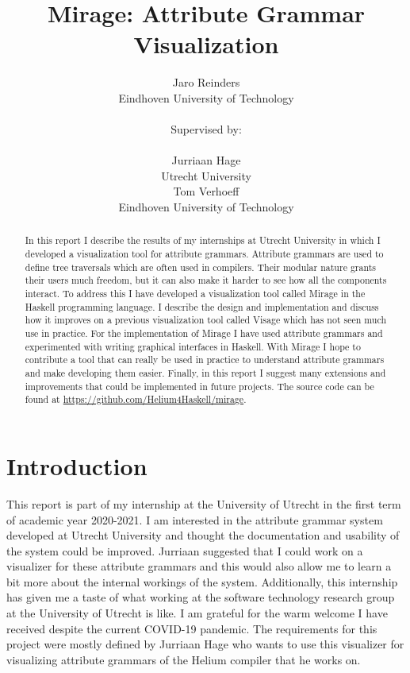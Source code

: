 \documentclass[11pt]{article}
\author{
  Jaro Reinders\\ Eindhoven University of Technology \\
  \\
  Supervised by:
  \vspace{0.5em}\\
  \begin{minipage}[t]{.4\textwidth}
    \centering
  Jurriaan Hage\\
  Utrecht University
  \end{minipage}%
  \begin{minipage}[t]{.4\textwidth}
    \centering
  Tom Verhoeff\\
  Eindhoven University of Technology
  \end{minipage}
}
\title{Mirage: Attribute Grammar Visualization}
\begin{document}
\maketitle

\begin{abstract}
  In this report I describe the results of my internships at Utrecht University in which I developed a visualization tool for attribute grammars. Attribute grammars are used to define tree traversals which are often used in compilers. Their modular nature grants their users much freedom, but it can also make it harder to see how all the components interact. To address this I have developed a visualization tool called Mirage in the Haskell programming language. I describe the design and implementation and discuss how it improves on a previous visualization tool called Visage which has not seen much use in practice. For the implementation of Mirage I have used attribute grammars and experimented with writing graphical interfaces in Haskell. With Mirage I hope to contribute a tool that can really be used in practice to understand attribute grammars and make developing them easier. Finally, in this report I suggest many extensions and improvements that could be implemented in future projects. The source code can be found at \url{https://github.com/Helium4Haskell/mirage}.
\end{abstract}

\newpage

\tableofcontents

\newpage

\section{Introduction}

This report is part of my internship at the University of Utrecht in the first term of academic year 2020-2021. I am interested in the attribute grammar system developed at Utrecht University and thought the documentation and usability of the system could be improved. Jurriaan suggested that I could work on a visualizer for these attribute grammars and this would also allow me to learn a bit more about the internal workings of the system. Additionally, this internship has given me a taste of what working at the software technology research group at the University of Utrecht is like. I am grateful for the warm welcome I have received despite the current COVID-19 pandemic. The requirements for this project were mostly defined by Jurriaan Hage who wants to use this visualizer for visualizing attribute grammars of the Helium compiler that he works on.
\end{document}
